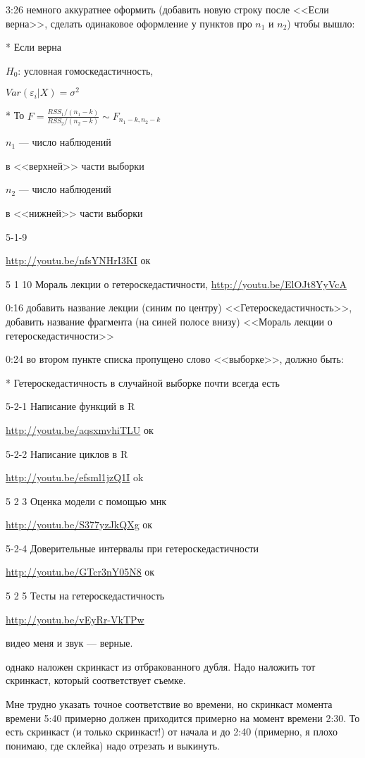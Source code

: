 \documentclass[12pt,a4paper]{article}
\newcommand{\e}{\varepsilon}
\begin{document}
3:26 немного аккуратнее оформить (добавить новую строку после <<Если верна>>, сделать одинаковое оформление у пунктов про $n_1$  и $n_2$) чтобы вышло:

* Если верна

$H_0$: условная гомоскедастичность, 

$Var(\e_i|X)=\sigma^2$

* То $F=\frac{RSS_1/(n_1-k)}{RSS_2/(n_2-k)} \sim F_{n_1-k,n_2-k}$

$n_1$ --- число наблюдений 

в <<верхней>> части выборки

$n_2$ --- число наблюдений 

в <<нижней>> части выборки

5-1-9 

\url{http://youtu.be/nfsYNHrI3KI} ок 

5 1 10 Мораль лекции о гетероскедастичности, \url{http://youtu.be/ElOJt8YyVcA}

0:16 добавить название лекции (синим по центру) <<Гетероскедастичность>>, добавить название фрагмента (на синей полосе внизу) <<Мораль лекции о гетероскедастичности>>

0:24 во втором пункте списка пропущено слово <<выборке>>, должно быть:

* Гетероскедастичность в случайной выборке почти всегда есть

5-2-1 Написание функций в R

\url{http://youtu.be/aqsxmvhiTLU} ок

5-2-2 Написание циклов в R

\url{http://youtu.be/efsml1jzQ1I} ok

5 2 3 Оценка модели с помощью мнк 

\url{http://youtu.be/S377yzJkQXg} ок

5-2-4 Доверительные интервалы при гетероскедастичности 

\url{http://youtu.be/GTcr3nY05N8} ок

5 2 5 Тесты на гетероскедастичность 

\url{http://youtu.be/vEyRr-VkTPw} 

видео меня и звук --- верные.

однако наложен скринкаст из отбракованного дубля. Надо наложить тот скринкаст, который соответствует съемке.

Мне трудно указать точное соответствие во времени, но скринкаст момента времени 5:40 примерно должен приходится примерно на момент времени 2:30. То есть скринкаст (и только скринкаст!) от начала и до 2:40 (примерно, я плохо понимаю, где склейка) надо отрезать и выкинуть.
\end{document}
